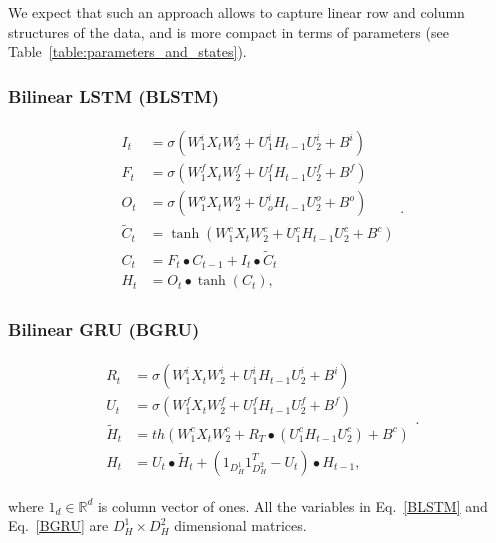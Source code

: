 \documentclass[a4paper,11pt]{article}
\begin{document}
We expect that such an approach allows to capture linear row and column structures of the data, and is more compact in terms of parameters (see Table~\ref{table:parameters_and_states}).


\subsubsection{Bilinear LSTM (BLSTM)} 
\begin{align}
\begin{split}
\label{BLSTM}
I_{t} &=\sigma(W_{1}^{i}X_{t}W_{2}^{i} + U_{1}^{i}H_{t-1}U_{2}^{i}  +  B^{i})\\
F_{t} &=\sigma(W_{1}^{f}X_{t}W_{2}^{f} + U_{1}^{f}H_{t-1}U_{2}^{f}  +  B^{f})\\
O_{t} &=\sigma(W_{1}^{o}X_{t}W_{2}^{o} + U_{o}^{i}H_{t-1}U_{2}^{o}  +  B^{o})\\
\tilde{C}_{t} &=\tanh(W_{1}^{c}X_{t}W_{2}^{c} + U_{1}^{c}H_{t-1}U_{2}^{c}  +  B^{c})\\
C_{t} &= F_{t} \bullet C_{t-1} + I_{t} \bullet \tilde{C}_{t}\\
H_{t} &= O_{t}\bullet \tanh(C_{t}),
\end{split}.
\end{align}



\subsubsection{Bilinear GRU (BGRU)} 
\begin{align}
\begin{split}
\label{BGRU}
R_{t} &=\sigma(W_{1}^{i}X_{t}W_{2}^{i} + U_{1}^{i}H_{t-1}U_{2}^{i}  +  B^{i})\\
U_{t} &=\sigma(W_{1}^{f}X_{t}W_{2}^{f} + U_{1}^{f}H_{t-1}U_{2}^{f}  +  B^{f})\\
\tilde{H}_{t} &= th(W_{1}^{c}X_{t}W_{2}^{c} + R_{T} \bullet (U_{1}^{c}H_{t-1}U_{2}^{c})  +  B^{c})\\
H_{t} &= U_{t}\bullet \tilde{H}_{t} + (1_{D_{H}^{1}}1_{D_{H}^{2}}^{T} - U_{t})\bullet H_{t-1},
\end{split}.
\end{align}

\noindent where $1_{d} \in \mathbb{R}^{d}$ is column vector of ones. All the variables in Eq.~\eqref{BLSTM} and Eq.~\eqref{BGRU} are $D_{H}^{1} \times D_{H}^{2}$ dimensional matrices.
\end{document}
